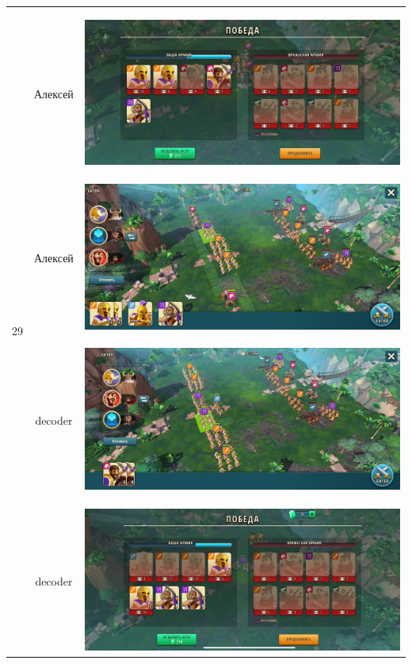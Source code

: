 \begin{longtable}{|c|c|c|}
	\hline
	\multirow{6}{*}{29} & Алексей &
	\hypertarget{fight29}{\includegraphics[width=0.75\linewidth]{./parts/media/TreasureHunt/29/alexey/photo_2022-04-07_13-17-44.jpg}} \\
	& Алексей &
	\includegraphics[width=0.75\linewidth]{./parts/media/TreasureHunt/29/alexey/photo_2022-04-07_13-18-00.jpg} \\
	\hline
	\multirow{6}{*}{29} & decoder &
	\hypertarget{fight29}{\includegraphics[width=0.75\linewidth]{./parts/media/TreasureHunt/29/decoder/photo_2022-04-07_09-59-10.jpg}} \\
	& decoder &
	\includegraphics[width=0.75\linewidth]{./parts/media/TreasureHunt/29/decoder/photo_2022-04-07_09-59-23.jpg} \\

\end{longtable}

